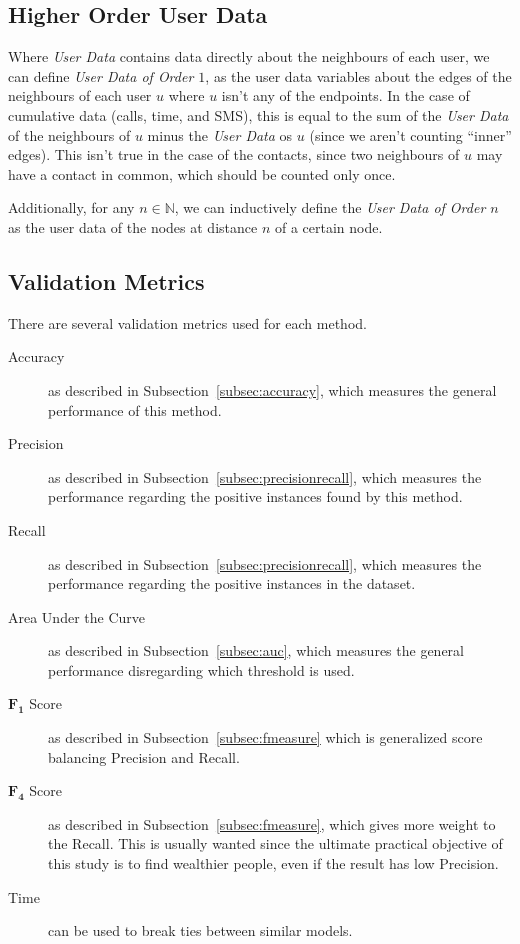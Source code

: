 \subsection{Higher Order User Data}
\label{subsec:higherorderuserdata}

Where \emph{User Data} contains data directly about the neighbours of each user, we can define \emph{User Data of Order $1$}, as the user data variables about the edges of the neighbours of each user $u$ where $u$ isn't any of the endpoints. In the case of cumulative data (calls, time, and SMS), this is equal to the sum of the \emph{User Data} of the neighbours of $u$ minus the \emph{User Data} os $u$ (since we aren't counting ``inner'' edges). This isn't true in the case of the contacts, since two neighbours of $u$ may have a contact in common, which should be counted only once.

Additionally, for any $n \in \mathbb{N}$, we can inductively define the \emph{User Data of Order $n$} as the user data of the nodes at distance $n$ of a certain node.

\subsection{Validation Metrics}
\label{subsec:validationmetrics}
There are several validation metrics used for each method.

\begin{description}
	\item[Accuracy] as described in Subsection~\ref{subsec:accuracy}, which measures the general performance of this method.
	\item[Precision] as described in Subsection~\ref{subsec:precisionrecall}, which measures the performance regarding the positive instances found by this method.
	\item[Recall] as described in Subsection~\ref{subsec:precisionrecall}, which measures the performance regarding the positive instances in the dataset.
	\item[Area Under the Curve] as described in Subsection~\ref{subsec:auc}, which measures the general performance disregarding which threshold is used.
	\item[$\mathbf{F_1}$ Score] as described in Subsection~\ref{subsec:fmeasure} which is generalized score balancing Precision and Recall.
	\item[$\mathbf{F_4}$ Score] as described in Subsection~\ref{subsec:fmeasure}, which gives more weight to the Recall. This is usually wanted since the ultimate practical objective of this study is to find wealthier people, even if the result has low Precision.
	\item[Time] can be used to break ties between similar models.
\end{description}


